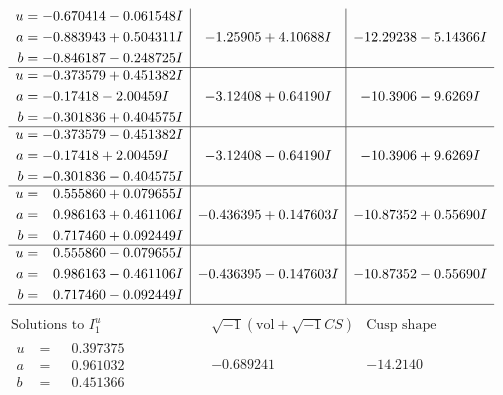 \documentclass[1p]{elsarticle_modified}
\theoremstyle{definition}
\newcommand{\I}{\sqrt{-1}}
\begin{document}
$$\begin{array}{c|c|c}
\begin{aligned}
u &= -0.670414 - 0.061548 I \\
a &= -0.883943 + 0.504311 I \\
b &= -0.846187 - 0.248725 I\end{aligned}
 & -1.25905 + 4.10688 I & -12.29238 - 5.14366 I \\ \hline\begin{aligned}
u &= -0.373579 + 0.451382 I \\
a &= -0.17418 - 2.00459 I \\
b &= -0.301836 + 0.404575 I\end{aligned}
 & -3.12408 + 0.64190 I & -10.3906 - 9.6269 I \\ \hline\begin{aligned}
u &= -0.373579 - 0.451382 I \\
a &= -0.17418 + 2.00459 I \\
b &= -0.301836 - 0.404575 I\end{aligned}
 & -3.12408 - 0.64190 I & -10.3906 + 9.6269 I \\ \hline\begin{aligned}
u &= \phantom{-}0.555860 + 0.079655 I \\
a &= \phantom{-}0.986163 + 0.461106 I \\
b &= \phantom{-}0.717460 + 0.092449 I\end{aligned}
 & -0.436395 + 0.147603 I & -10.87352 + 0.55690 I \\ \hline\begin{aligned}
u &= \phantom{-}0.555860 - 0.079655 I \\
a &= \phantom{-}0.986163 - 0.461106 I \\
b &= \phantom{-}0.717460 - 0.092449 I\end{aligned}
 & -0.436395 - 0.147603 I & -10.87352 - 0.55690 I\\
 \hline 
 \end{array}$$\newpage$$\begin{array}{c|c|c}  
\text{Solutions to }I^u_{1}& \I (\text{vol} + \sqrt{-1}CS) & \text{Cusp shape}\\
 \hline 
\begin{aligned}
u &= \phantom{-}0.397375\phantom{ +0.000000I} \\
a &= \phantom{-}0.961032\phantom{ +0.000000I} \\
b &= \phantom{-}0.451366\phantom{ +0.000000I}\end{aligned}
 & -0.689241\phantom{ +0.000000I} & -14.2140\phantom{ +0.000000I} \\ \hline\begin{aligned}

\end{aligned}
\end{array}$$
\end{document}
